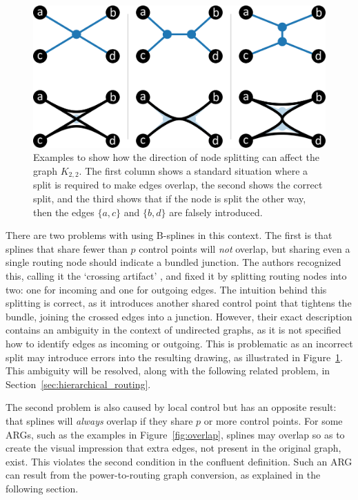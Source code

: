 \begin{figure}
  \centering
  \includegraphics[width=.8\textwidth]{power/nodesplit.pdf}
  \caption[Examples of the node split problem]{Examples to show how the direction of node splitting can affect the graph $K_{2,2}$. The first column shows a standard situation where a split is required to make edges overlap, the second shows the correct split, and the third shows that if the node is split the other way, then the edges $\{a,c\}$ and $\{b,d\}$ are falsely introduced.
  }
  \label{fig:nodesplit}
\end{figure}

There are two problems with using B-splines in this context. The first is that splines that share fewer than $p$ control points will \emph{not} overlap, but sharing even a single routing node should indicate a bundled junction.
The authors recognized this, calling it the `crossing artifact' \cite[Fig.~4]{Bach2017}, and fixed it by splitting routing nodes into two: one for incoming and one for outgoing edges.
The intuition behind this splitting is correct, as it introduces another shared control point that tightens the bundle, joining the crossed edges into a junction. However, their exact description contains an ambiguity in the context of undirected graphs, as it is not specified how to identify edges as incoming or outgoing. This is problematic as an incorrect split may introduce errors into the resulting drawing, as illustrated in Figure~\ref{fig:nodesplit}.
This ambiguity will be resolved, along with the following related problem, in Section~\ref{sec:hierarchical_routing}.

The second problem is also caused by local control but has an opposite result: that splines will \emph{always} overlap if they share $p$ or more control points.
For some ARGs, such as the examples in Figure~\ref{fig:overlap}, splines may overlap so as to create the visual impression that extra edges, not present in the original graph, exist. This violates the second condition in the confluent definition.
Such an ARG can result from the power-to-routing graph conversion, as explained in the following section.

